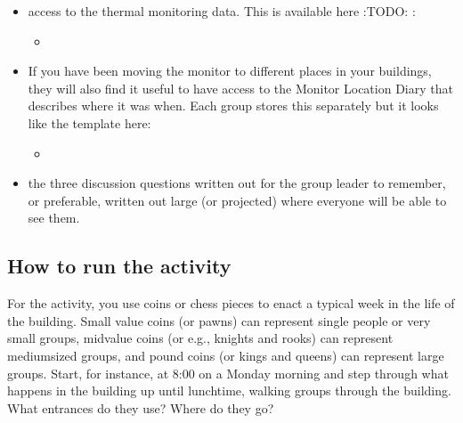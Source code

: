 \documentclass[letterpaper,10pt,english]{jupyterBook}
\begin{document}
\begin{itemize}
\item {} 
\sphinxAtStartPar
access to the thermal monitoring data.  This is available here :TODO: :
\begin{itemize}
\item {} 
\sphinxAtStartPar
{}

\end{itemize}

\item {} 
\sphinxAtStartPar
If you have been moving the monitor to different places in your buildings, they will also find it useful to have access to the Monitor Location Diary that describes where it was when.  Each group stores this separately but it looks like the template here:
\begin{itemize}
\item {} 
\sphinxAtStartPar
{}

\end{itemize}

\end{itemize}


\begin{itemize}
\item {} 
\sphinxAtStartPar
the three discussion questions written out for the group leader to remember, or preferable, written out large (or projected) where everyone will be able to see them.

\end{itemize}


\subsection{How to run the activity}
\label{\detokenize{session3/details/activity:how-to-run-the-activity}}
\sphinxAtStartPar
For the activity, you use coins or chess pieces to enact a typical week in the life of the building.  Small value coins (or pawns) can represent single people or very small groups, mid\sphinxhyphen{}value coins (or e.g., knights and rooks) can represent medium\sphinxhyphen{}sized groups, and pound coins (or kings and queens) can represent large groups.  Start, for instance, at 8:00 on a Monday morning and step through what happens in the building up until lunchtime, walking groups through the building. What entrances do they use?  Where do they go?
\end{document}
